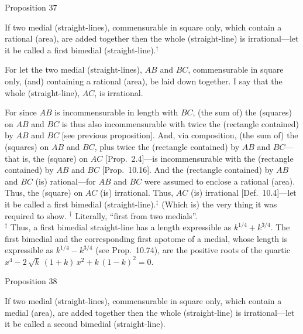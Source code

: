 
\begin{center}
{\large Proposition 37}
\end{center}

If two medial (straight-lines), commensurable in square only, which contain a rational (area), are added together then
the whole (straight-line) is irrational---let it be called a first bimedial (straight-line).$^\dag$

\epsfysize=0.3in
\centerline{}

For let the  two medial (straight-lines), $AB$ and $BC$, 
commensurable in square only, (and) containing a rational (area), be laid down together. I say that the
whole (straight-line), $AC$, is irrational.

For since $AB$ is incommensurable in length with $BC$, (the sum of)
the (squares) on $AB$ and $BC$ is thus also incommensurable with twice
the (rectangle contained) by $AB$ and $BC$ [see previous proposition].
And, via composition, (the sum of) the (squares)  on $AB$ and $BC$,
plus twice the (rectangle contained) by $AB$ and $BC$---that is, 
the (square) on $AC$ [Prop.~2.4]---is incommensurable with the (rectangle contained) by $AB$ and $BC$
[Prop.~10.16]. And the (rectangle contained) by
$AB$ and $BC$ (is) rational---for $AB$ and $BC$ were assumed to
enclose a rational (area). Thus, the (square) on $AC$ (is) irrational. Thus, $AC$ (is) irrational [Def.~10.4]---let it be called
a first bimedial (straight-line).$^\ddag$
 (Which is) the very thing it was required to show.
{\footnotesize\noindent$^\dag$ Literally, ``first from two medials''.\\[0.5ex]
$^\ddag$ Thus, a first bimedial straight-line
has a length expressible as $k^{1/4}+k^{3/4}$. The first bimedial and the corresponding first apotome of a medial, whose length is expressible as
$k^{1/4}-k^{3/4}$ (see Prop.~10.74), are
the positive roots of the quartic $x^4-2\,\sqrt{k}\,(1+k)\,x^2+ k\,(1-k)^2 = 0$.}


\begin{center}
{\large Proposition 38}
\end{center}
If two medial (straight-lines), commensurable in
square only, which contain a medial (area), are added together then the
whole (straight-line) is irrational---let it be called a second bimedial
(straight-line).

